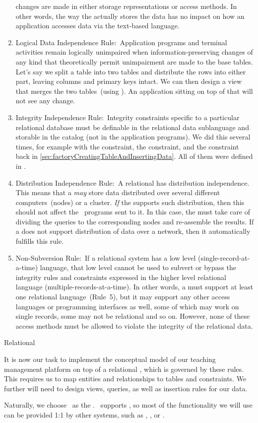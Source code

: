 \begin{enumerate}
changes are made in either storage representations or access methods.
In other words, the way the  actually stores the data has no impact on how an application accesses data via the text-based language.%
%
\item Logical Data Independence Rule:~Application programs and terminal activities remain logically unimpaired when information-preserving changes of any kind that theoretically permit unimpairment are made to the base tables.
Let's say we split a table into two tables and distribute the rows into either part, leaving columns and primary keys intact.
We can then design a view that merges the two tables~(using ).
An application sitting on top of that will not see any change.%
%
\item Integrity Independence Rule:~Integrity constraints specific to a particular relational database must be definable in the relational data sublanguage and storable in the catalog (not in the application programs).
We did this several times, for example with the  constraint, the  constraint, and the  constraint back in \cref{sec:factoryCreatingTableAndInsertingData}.
All of them were defined in \sql.
%
\item Distribution Independence Rule:~A relational  has distribution independence.
This means that a  \emph{may} store data distributed over several different computers~(nodes) or a cluster.
\emph{If} the  supports such distribution, then this should not affect the \sql\ programs sent to it.
In this case, the  must take care of dividing the queries to the corresponding nodes and re-assemble the results.
If a  does not support distribution of data over a network, then it automatically fulfills this rule.%
%
\item Non-Subversion Rule:~If a relational system has a low level (single-record-at-a-time) language, that low level cannot be used to subvert or bypass the integrity rules and constraints expressed in the higher level relational language (multiple-records-at-a-time).
In other words, a  must support at least one relational language~(Rule~5), but it may support any other access languages or programming interfaces as well, some of which may work on single records, some may not be relational and so on.
However, none of these access methods must be allowed to violate the integrity of the relational data.%
%
\end{enumerate}%
%
Relational


It is now our task to implement the conceptual model of our teaching management platform on top of a relational , which is governed by these rules.
This requires us to map entities and relationships to tables and constraints.
We further will need to design views, queries, as well as insertion rules for our data.

Naturally, we choose \postgresql\ as the .
\postgresql\ supports \sql, so most of the functionality we will use can be provided 1:1 by other systems, such as \mysql, \mariadb, or \sqlite.%
%
\endhsection%
%
